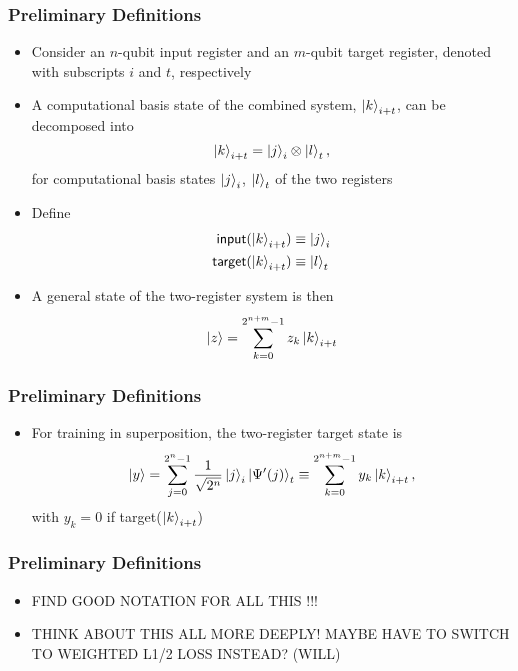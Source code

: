 \documentclass{beamer}
\begin{document}
\begin{frame}
\frametitle{Preliminary Definitions}
\begin{itemize}
\item Consider an $n$-qubit \alert{input register} and an $m$-qubit \alert{target register}, denoted with subscripts $i$ and $t$, respectively 
\item A computational basis state of the combined system, $\ket{k}_{i+t}$, can be decomposed into
\begin{equation}
\ket{k}_{i+t} = \ket{j}_i \otimes \ket{l}_t,
\end{equation}
for computational basis states $\ket{j}_i$, $\ket{l}_t$ of the two registers
\item Define 
\begin{align}
\mathsf{input}(\ket{k}_{i+t}) &\equiv \ket{j}_i \\
\mathsf{target}(\ket{k}_{i+t}) &\equiv \ket{l}_t \\
\end{align}
\item A \alert{general state of the two-register system} is then 
\begin{equation}
\ket{z} = \sum^{2^{n+m}-1}_{k=0} z_k \ket{k}_{i+t}
\end{equation}
\end{itemize}
\end{frame}

\begin{frame}
\frametitle{Preliminary Definitions}
\begin{itemize}
\item For training in superposition, the two-register target state is 
\begin{equation}
\ket{y} = \sum_{j=0}^{2^n -1} \frac{1}{\sqrt{2^n}} \ket{j}_i \ket{\Psi'(j)}_t \equiv \sum_{k=0}^{2^{n+m}-1} y_k \ket{k}_{i+t}, 
\end{equation}
with $y_k =0$ if target($\ket{k}_{i+t}$)
\end{itemize}
\end{frame}

\begin{frame}
\frametitle{Preliminary Definitions}
\begin{itemize}
\item FIND GOOD NOTATION FOR ALL THIS !!!
\item THINK ABOUT THIS ALL MORE DEEPLY! MAYBE HAVE TO SWITCH TO WEIGHTED L1/2 LOSS INSTEAD? (WILL)
\end{itemize}
\end{frame}
\end{document}
